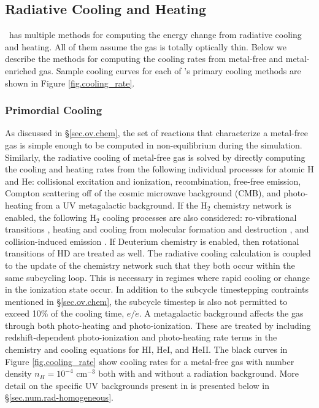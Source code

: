 \subsection{Radiative Cooling and Heating}
\label{sec.num.cooling}

\enzo\ has multiple methods for computing the energy change from
radiative cooling and heating.  All of them assume the gas is totally
optically thin.  Below we describe the methods for computing the
cooling rates from metal-free and metal-enriched gas.  Sample cooling
curves for each of \enzo's primary cooling methods are shown in Figure
\ref{fig.cooling_rate}.

\subsubsection{Primordial Cooling}

As discussed in \S\ref{sec.ov.chem}, the set of reactions that
characterize a metal-free gas is simple enough to be computed in
non-equilibrium during the simulation.  Similarly, the radiative
cooling of metal-free gas is solved by directly computing the cooling
and heating rates from the following individual processes for atomic
H and He: collisional excitation and ionization, recombination,
free-free emission, Compton scattering off of the cosmic microwave
background (CMB), and photo-heating from a UV metagalactic background.
If the H$_{2}$ chemistry network is enabled, the following H$_{2}$
cooling processes are also considered: ro-vibrational transitions 
\citep{1998A&A...335..403G}, heating and cooling from molecular
formation and destruction \citep{2009Sci...325..601T}, and 
collision-induced emission \citep{2004MNRAS.348.1019R}.  If Deuterium
chemistry is enabled, then rotational transitions of HD
\citep{1998A&A...335..403G} are treated as well.  The radiative
cooling calculation is coupled to the update of the chemistry network
such that they both occur within the same subcycling loop.  This is
necessary in regimes where rapid cooling or change in the ionization
state occur.  In
addition to the subcycle timestepping contraints mentioned in
\S\ref{sec.ov.chem}, the subcycle timestep is also not permitted to
exceed 10\% of the cooling time, $e/\dot{e}$.  A metagalactic
background affects the gas through both photo-heating and
photo-ionization.  These are treated by including redshift-dependent 
photo-ionization and photo-heating rate terms in the chemistry and
cooling equations for HI, HeI, and HeII.  The black curves in Figure
\ref{fig.cooling_rate} show cooling rates for a metal-free gas with
number density $n_{H} = 10^{-4}$ cm$^{-3}$ both with and without a
radiation background.  More detail on the specific UV backgrounds
present in \enzo is presented below in
\S\ref{sec.num.rad-homogeneous}.

